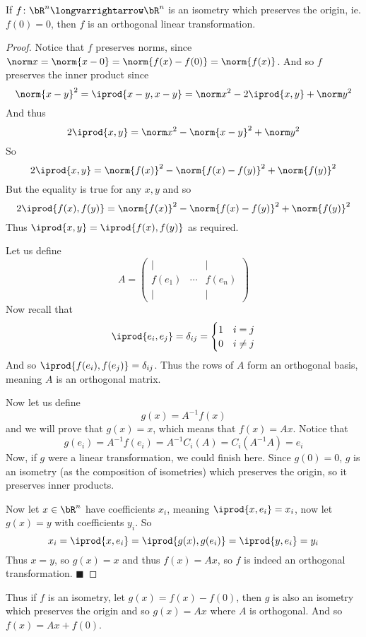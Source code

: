 \documentclass[10pt]{article}
\def\pmat#1{\begin{pmatrix} #1 \end{pmatrix}}
\def\pmat#1{\begin{pmatrix}#1\end{pmatrix}}
\let\longto=\longvarrightarrow
\def\qed{%
    \ifmmode%
        \eqno\blacksquare%
    \else%
        \hskip1cm\allowbreak\hbox{}\nobreak\hfill$\blacksquare$%
    \fi%
}
\begin{document}
\begin{prop*}

    If $f\colon\bR^n\longto\bR^n$ is an isometry which preserves the origin, ie. $f(0)=0$, then $f$ is an orthogonal linear transformation.

\end{prop*}

\begin{proof}

    Notice that $f$ preserves norms, since $\norm x=\norm{x-0}=\norm{f(x)-f(0)}=\norm{f(x)}$.
    And so $f$ preserves the inner product since
    \[ \norm{x-y}^2 = \iprod{x-y,x-y} = \norm x^2-2\iprod{x,y}+\norm y^2 \]
    And thus
    \[ 2\iprod{x,y} = \norm x^2-\norm{x-y}^2+\norm y^2 \]
    So
    \[ 2\iprod{x,y} = \norm{f(x)}^2-\norm{f(x)-f(y)}^2+\norm{f(y)}^2 \]
    But the equality is true for any $x,y$ and so
    \[ 2\iprod{f(x),f(y)} = \norm{f(x)}^2-\norm{f(x)-f(y)}^2+\norm{f(y)}^2 \]
    Thus $\iprod{x,y}=\iprod{f(x),f(y)}$ as required.

    Let us define
    \[ A = \pmat{\vert & & \vert \\ f(e_1) & \cdots & f(e_n) \\ \vert & & \vert} \]
    Now recall that
    \[ \iprod{e_i,e_j} = \delta_{ij} = \begin{cases} 1 & i=j \\ 0 & i\neq j \end{cases} \]
    And so $\iprod{f(e_i),f(e_j)}=\delta_{ij}$.
    Thus the rows of $A$ form an orthogonal basis, meaning $A$ is an orthogonal matrix.

    Now let us define
    \[ g(x) = A^{-1}f(x) \]
    and we will prove that $g(x)=x$, which means that $f(x)=Ax$.
    Notice that
    \[ g(e_i) = A^{-1}f(e_i) = A^{-1}C_i(A) = C_i(A^{-1}A) = e_i \]
    Now, if $g$ were a linear transformation, we could finish here.
    Since $g(0)=0$, $g$ is an isometry (as the composition of isometries) which preserves the origin, so it preserves inner products.

    Now let $x\in\bR^n$ have coefficients $x_i$, meaning $\iprod{x,e_i}=x_i$, now let $g(x)=y$ with coefficients $y_i$.
    So
    \[ x_i = \iprod{x,e_i} = \iprod{g(x),g(e_i)} = \iprod{y,e_i} = y_i \]
    Thus $x=y$, so $g(x)=x$ and thus $f(x)=Ax$, so $f$ is indeed an orthogonal transformation.
    \qed

\end{proof}

Thus if $f$ is an isometry, let $g(x)=f(x)-f(0)$, then $g$ is also an isometry which preserves the origin and so $g(x)=Ax$ where $A$ is orthogonal.
And so $f(x)=Ax+f(0)$.
\end{document}
